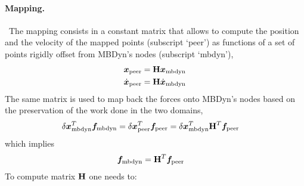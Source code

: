 \paragraph{Mapping.} \
The mapping consists in a constant matrix that allows to compute
the position and the velocity of the mapped points (subscript `peer')
as functions of a set of points rigidly offset from MBDyn's nodes
(subscript `mbdyn'),
\begin{subequations}
\begin{align}
	\boldsymbol{x}_\text{peer}
	&=
	\bm{\mathbf H} \boldsymbol{x}_\text{mbdyn}
	\\
	\dot{\boldsymbol{x}}_\text{peer}
	&=
	\bm{\mathbf H} \dot{\boldsymbol{x}}_\text{mbdyn}
\end{align}
\end{subequations}
The same matrix is used to map back the forces onto MBDyn's nodes
based on the preservation of the work done in the two domains,
\begin{align}
	\delta\boldsymbol{x}_\text{mbdyn}^T \boldsymbol{f}_\text{mbdyn}
	&=
	\delta\boldsymbol{x}_\text{peer}^T \boldsymbol{f}_\text{peer}
	=
	\delta\boldsymbol{x}_\text{mbdyn}^T \bm{\mathbf H}^T \boldsymbol{f}_\text{peer}
\end{align}
which implies
\begin{align}
	\boldsymbol{f}_\text{mbdyn}
	&=
	\bm{\mathbf H}^T \boldsymbol{f}_\text{peer}
\end{align}
To compute matrix $\bm{\mathbf H}$ one needs to:
